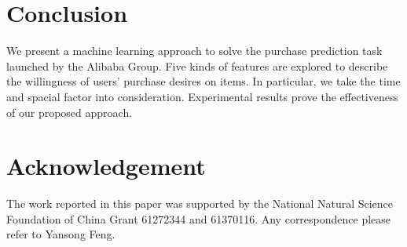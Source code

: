 \documentclass{llncs}
\begin{document}
\section{Conclusion}
We present a machine learning approach to solve
the purchase prediction task launched by the Alibaba Group.
Five kinds of features are explored to describe
the willingness of users' purchase desires on items.
In particular, we take the time and spacial factor into consideration.
Experimental results prove the effectiveness of our proposed approach.


\section*{Acknowledgement}
The work reported in this paper was supported by the
National Natural Science Foundation of China Grant 61272344 and 61370116.
Any correspondence please refer to Yansong Feng.



\end{document}
